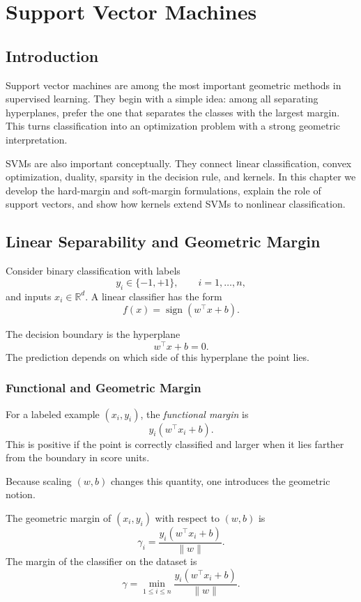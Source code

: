 \chapter{Support Vector Machines}

\section{Introduction}

Support vector machines are among the most important geometric methods in supervised learning. They begin with a simple idea: among all separating hyperplanes, prefer the one that separates the classes with the largest margin. This turns classification into an optimization problem with a strong geometric interpretation.

SVMs are also important conceptually. They connect linear classification, convex optimization, duality, sparsity in the decision rule, and kernels. In this chapter we develop the hard-margin and soft-margin formulations, explain the role of support vectors, and show how kernels extend SVMs to nonlinear classification.

\section{Linear Separability and Geometric Margin}

Consider binary classification with labels
\[
y_i\in\{-1,+1\},
\qquad i=1,\dots,n,
\]
and inputs $x_i\in\mathbb R^d$. A linear classifier has the form
\[
f(x)=\operatorname{sign}(w^\top x+b).
\]

The decision boundary is the hyperplane
\[
w^\top x+b=0.
\]
The prediction depends on which side of this hyperplane the point lies.

\subsection{Functional and Geometric Margin}

For a labeled example $(x_i,y_i)$, the \emph{functional margin} is
\[
y_i(w^\top x_i+b).
\]
This is positive if the point is correctly classified and larger when it lies farther from the boundary in score units.

Because scaling $(w,b)$ changes this quantity, one introduces the geometric notion.

\begin{definition}
The geometric margin of $(x_i,y_i)$ with respect to $(w,b)$ is
\[
\gamma_i=\frac{y_i(w^\top x_i+b)}{\|w\|}.
\]
The margin of the classifier on the dataset is
\[
\gamma=\min_{1\le i\le n}\frac{y_i(w^\top x_i+b)}{\|w\|}.
\]
\end{definition}

